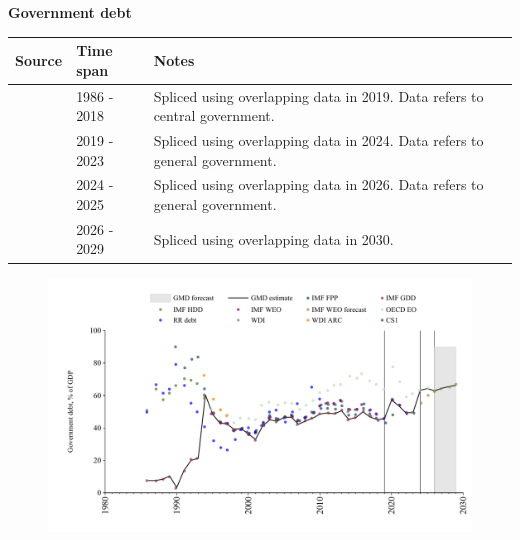 \documentclass[12pt,a4paper,landscape]{article}
\begin{document}
\begin{adjustbox}{max totalsize={\paperwidth}{\paperheight},center}
\begin{minipage}[t][\textheight][t]{\textwidth}
\vspace*{0.5cm}
{}
\begin{center}
{\Large\bfseries Government debt}
\end{center}
\vspace{0.5cm}
\begin{table}[H]
\centering
\small
\begin{tabular}{|l|l|l|}
\hline
\textbf{Source} & \textbf{Time span} & \textbf{Notes} \\
\hline
\rowcolor{white}\cite{IMF_GDD}& 1986 - 2018 &Spliced using overlapping data in 2019. Data refers to central government.\\
\rowcolor{lightgray}\cite{IMF_FPP}& 2019 - 2023 &Spliced using overlapping data in 2024. Data refers to general government.\\
\rowcolor{white}\cite{OECD_EO}& 2024 - 2025 &Spliced using overlapping data in 2026. Data refers to general government.\\
\rowcolor{lightgray}\cite{IMF_WEO_forecast}& 2026 - 2029 &Spliced using overlapping data in 2030. \\
\hline
\end{tabular}
\end{table}
\begin{figure}[H]
\centering
\includegraphics[width=\textwidth,height=0.6\textheight,keepaspectratio]{graphs/POL_govdebt_GDP.pdf}
\end{figure}
\end{minipage}
\end{adjustbox}
\end{document}

